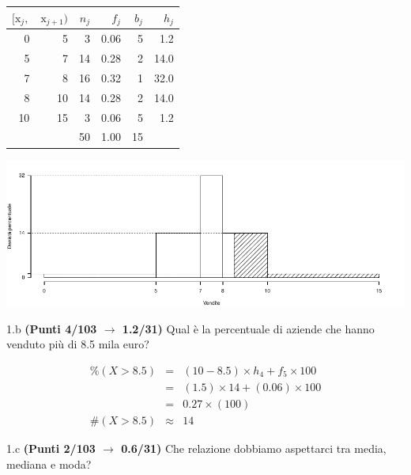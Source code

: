 \documentclass[
  11pt,
]{book}
\theoremstyle{mytheoremstyle}
\theoremstyle{mydefstyle}
\newenvironment{sol}
  {
  \begin{tcolorbox}[enhanced,breakable,arc=0.1mm,boxrule=1pt,colback=white,colframe=iblue,
  title=\bf \fontfamily{lmss}\selectfont \hspace{.5 cm} Soluzione,drop fuzzy shadow]

}{
\end{tcolorbox}
  }
\begin{document}
\begin{sol}

\begin{table}[H]
\centering
\begin{tabular}{rrrrrr}
\toprule
$[\text{x}_j,$ & $\text{x}_{j+1})$ & $n_j$ & $f_j$ & $b_j$ & $h_j$\\
\midrule
0 & 5 & 3 & 0.06 & 5 & 1.2\\
5 & 7 & 14 & 0.28 & 2 & 14.0\\
7 & 8 & 16 & 0.32 & 1 & 32.0\\
8 & 10 & 14 & 0.28 & 2 & 14.0\\
10 & 15 & 3 & 0.06 & 5 & 1.2\\
 &  & 50 & 1.00 & 15 & \\
\bottomrule
\end{tabular}
\end{table}

\begin{center}\includegraphics{Esami_passati_con_soluzioni_files/figure-latex/3.1a-1} \end{center}

\end{sol}

1.b \textbf{(Punti 4/103 \(\rightarrow\) 1.2/31)} Qual è la percentuale di aziende che hanno venduto più di 8.5 mila euro?

\begin{sol}
\begin{eqnarray*}
     \%(X> 8.5 ) &=& ( 10 - 8.5 )\times h_{ 4 }+ f_{ 5 }\times 100 \\
              &=& ( 1.5 )\times 14 + ( 0.06 )\times 100 \\
              &=&  0.27 \times(100)\\
     \#(X> 8.5 ) &\approx& 14 
         \end{eqnarray*}

\end{sol}

1.c \textbf{(Punti 2/103 \(\rightarrow\) 0.6/31)} Che relazione dobbiamo aspettarci tra media, mediana e moda?
\end{document}
